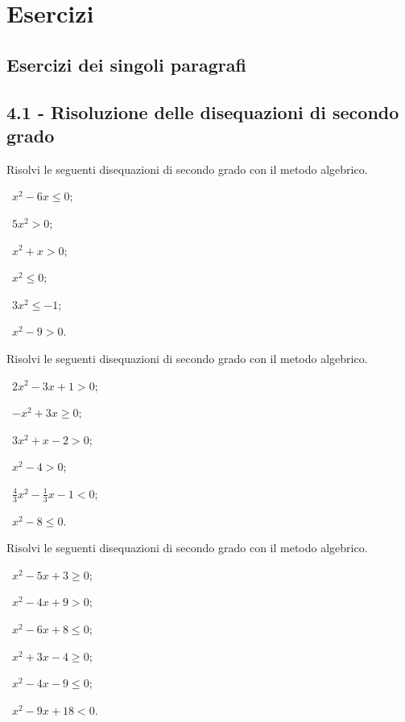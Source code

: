 \section{Esercizi}
\subsection{Esercizi dei singoli paragrafi}
\subsection*{4.1 - Risoluzione delle disequazioni di secondo grado}

\begin{esercizio}[\Ast]
 \label{ese:4.1}
Risolvi le seguenti disequazioni di secondo grado con il metodo algebrico.
\begin{multicols}{3}
 \begin{enumeratea}
 \item~$x^2-6x\le 0$;
 \item~$5x^2>0$;
 \item~$x^2+x>0$;
 \item~$x^2\le 0$;
 \item~$3x^2\le -1$;
 \item~$x^2-9>0$.
 \end{enumeratea}
 \end{multicols}
\end{esercizio}

\begin{esercizio}[\Ast]
\label{ese:4.2}
Risolvi le seguenti disequazioni di secondo grado con il metodo algebrico.
\begin{multicols}{3}
 \begin{enumeratea}
 \item~$2x^2-3x+1>0$;
 \item~$-x^2+3x\ge 0$;
 \item~$3x^2+x-2>0$;
 \item~$x^2-4>0$;
 \item~$\frac 4 3x^2-\frac 1 3x-1<0$;
 \item~$x^2-8\le 0$.
 \end{enumeratea}
 \end{multicols}
\end{esercizio}

\begin{esercizio}[\Ast]
 \label{ese:4.3}
Risolvi le seguenti disequazioni di secondo grado con il metodo algebrico.
\begin{multicols}{3}
 \begin{enumeratea}
 \item~$x^2-5x+3\ge 0$;
 \item~$x^2-4x+9>0$;
 \item~$x^2-6x+8\le 0$;
 \item~$x^2+3x-4\ge 0$;
 \item~$x^2-4x-9\le 0$;
 \item~$x^2-9x+18<0$.
 \end{enumeratea}
 \end{multicols}
\end{esercizio}

